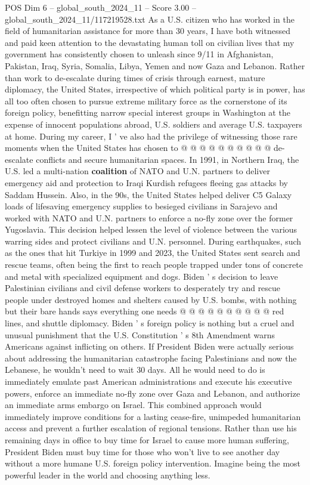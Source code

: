 \begin{textsample}{POS Dim 6 – global\_south\_2024\_11 – Score 3.00 – global\_south\_2024\_11/117219528.txt}
As a U.S. citizen who has worked in the field of humanitarian assistance for more than 30 years, I have both witnessed and paid keen attention to the devastating human toll on civilian lives that my government has consistently chosen to unleash since 9/11 in Afghanistan, Pakistan, Iraq, Syria, Somalia, Libya, Yemen and now Gaza and Lebanon.
Rather than work to de-escalate during times of crisis through earnest, mature diplomacy, the United States, irrespective of which political party is in power, has all too often chosen to pursue extreme military force as the cornerstone of its foreign policy, benefitting narrow special interest groups in Washington at the expense of innocent populations abroad, U.S. soldiers and average U.S. taxpayers at home.
During my career, I ' ve also had the privilege of witnessing those rare moments when the United States has chosen to @ @ @ @ @ @ @ @ @ @ de-escalate conflicts and secure humanitarian spaces.
In 1991, in Northern Iraq, the U.S. led a multi-nation \textbf{coalition} of NATO and U.N. partners to deliver emergency aid and protection to Iraqi Kurdish refugees fleeing gas attacks by Saddam Hussein.
Also, in the 90s, the United States helped deliver C5 Galaxy loads of lifesaving emergency supplies to besieged civilians in Sarajevo and worked with NATO and U.N. partners to enforce a no-fly zone over the former Yugoslavia.
This decision helped lessen the level of violence between the various warring sides and protect civilians and U.N. personnel.
During earthquakes, such as the ones that hit Turkiye in 1999 and 2023, the United States sent search and rescue teams, often being the first to reach people trapped under tons of concrete and metal with specialized equipment and dogs.
Biden ' s decision to leave Palestinian civilians and civil defense workers to desperately try and rescue people under destroyed homes and shelters caused by U.S. bombs, with nothing but their bare hands says everything one needs @ @ @ @ @ @ @ @ @ @ red lines, and shuttle diplomacy.
Biden ' s foreign policy is nothing but a cruel and unusual punishment that the U.S.
Constitution ' s 8th Amendment warns Americans against inflicting on others.
If President Biden were actually serious about addressing the humanitarian catastrophe facing Palestinians and now the Lebanese, he wouldn't need to wait 30 days.
All he would need to do is immediately emulate past American administrations and execute his executive powers, enforce an immediate no-fly zone over Gaza and Lebanon, and authorize an immediate arms embargo on Israel.
This combined approach would immediately improve conditions for a lasting cease-fire, unimpeded humanitarian access and prevent a further escalation of regional tensions.
Rather than use his remaining days in office to buy time for Israel to cause more human suffering, President Biden must buy time for those who won't live to see another day without a more humane U.S. foreign policy intervention.
Imagine being the most powerful leader in the world and choosing anything less.

\end{textsample}
